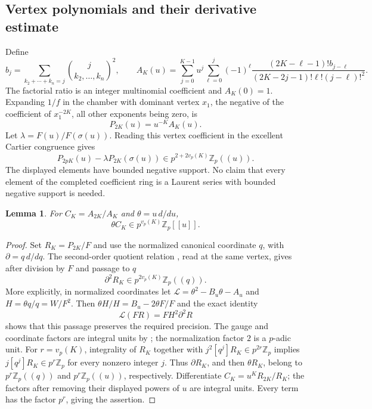 \documentclass[11pt,a4paper]{article}
\newtheorem{lemma}[theorem]{Lemma}
\theoremstyle{definition}\newtheorem{definition}[theorem]{Definition}
\theoremstyle{remark}\newtheorem{remark}[theorem]{Remark}
\newcommand{\Z}{\mathbb Z}
\newcommand{\vp}{v_p}
\numberwithin{equation}{section}
\begin{document}
\subsection{Vertex polynomials and their derivative estimate}
Define
\[
 b_j=\sum_{k_2+\cdots+k_n=j}\binom{j}{k_2,\ldots,k_n}^{\!2},\qquad
 A_K(u)=\sum_{j=0}^{K-1}u^j\sum_{\ell=0}^j(-1)^\ell
 \frac{(2K-\ell-1)!b_{j-\ell}}
 {(2K-2j-1)!\ell!(j-\ell)!^2}.
\]
The factorial ratio is an integer multinomial coefficient and $A_K(0)=1$.
Expanding $1/f$ in the chamber with dominant vertex $x_1$, the negative
of the coefficient of $x_1^{-2K}$, all other exponents being zero, is
\[
 P_{2K}(u)=u^{-K}A_K(u).
\]
Let $\lambda=F(u)/F(\sigma(u))$. Reading this vertex coefficient in
the excellent Cartier congruence gives
\begin{equation}\label{SP:eq:vertex}
 P_{2pK}(u)-\lambda P_{2K}(\sigma(u))
       \in p^{2+2\vp(K)}\Z_p((u)).
\end{equation}
The displayed elements have bounded negative support. No claim that every
element of the completed coefficient ring is a Laurent series with bounded
negative support is needed.

\begin{lemma}\label{SP:lem:derivative}
For $C_K=A_{2K}/A_K$ and $\theta=u\,d/du$,
\[
 \theta C_K\in p^{\vp(K)}\Z_p[[u]].
\]
\end{lemma}
\begin{proof}
Set $R_K=P_{2K}/F$ and use the normalized canonical coordinate $q$, with
$\partial=q\,d/dq$. The second-order quotient relation
\cite[Proposition 7.6]{BV3}, read at the same vertex, gives after division
by $F$ and passage to $q$
\[
 \partial^2R_K\in p^{2\vp(K)}\Z_p((q)).
\]
More explicitly, in normalized coordinates let
$\mathcal L=\theta^2-B_u\theta-A_u$ and $H=\theta q/q=W/F^2$.
Then $\theta H/H=B_u-2\theta F/F$ and the exact identity
\[
\mathcal L(FR)=FH^2\partial^2R
\]
shows that this passage preserves the required precision.
The gauge and coordinate factors are integral units by
\cite[Proposition 7.9 and Corollary 7.11]{BV3}; the normalization factor
$2$ is a $p$-adic unit. For $r=\vp(K)$, integrality of $R_K$ together
with $j^2[q^j]R_K\in p^{2r}\Z_p$ implies
$j[q^j]R_K\in p^r\Z_p$ for every nonzero integer $j$.
Thus $\partial R_K$, and then $\theta R_K$, belong to
$p^r\Z_p((q))$ and $p^r\Z_p((u))$, respectively.
Differentiate $C_K=u^K R_{2K}/R_K$; the factors after removing their
displayed powers of $u$ are integral units. Every term has the factor
$p^r$, giving the assertion.
\end{proof}
\end{document}
